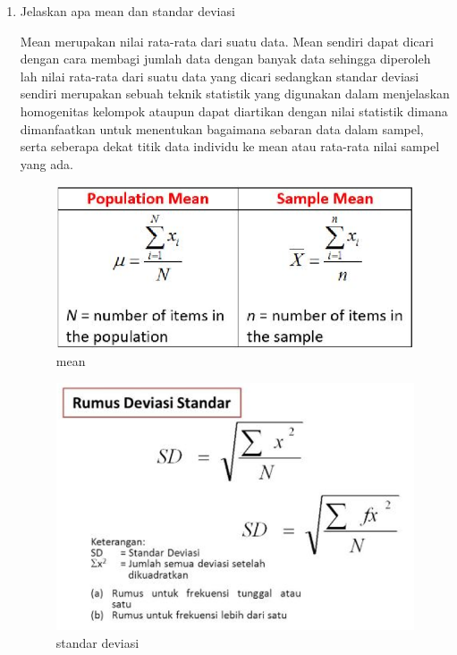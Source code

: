 \begin{enumerate}
			\item Jelaskan apa mean dan standar deviasi
			\par Mean merupakan nilai rata-rata dari suatu data. Mean sendiri dapat dicari dengan cara membagi jumlah data dengan banyak data sehingga diperoleh lah nilai rata-rata dari suatu data yang dicari sedangkan standar deviasi sendiri merupakan sebuah teknik statistik yang digunakan dalam menjelaskan homogenitas kelompok ataupun dapat diartikan dengan nilai statistik dimana dimanfaatkan untuk menentukan bagaimana sebaran data dalam sampel, serta seberapa dekat titik data individu ke mean atau rata-rata nilai sampel yang ada. 
			\begin{figure}[H]
				\centering
				\includegraphics[scale=0.4]{figures/1174057/chapter5/5.png}
				\caption{mean}
				\label{mean}
			\end{figure}

			\begin{figure}[H]
				\centering
				\includegraphics[scale=0.4]{figures/1174057/chapter5/5_1.png}
				\caption{standar deviasi}
				\label{standar deviasi}
			\end{figure}


\end{enumerate}

